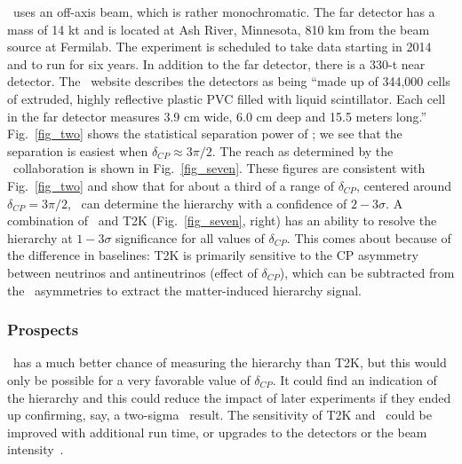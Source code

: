 \NOvA\ uses an off-axis beam, which is rather monochromatic.  The far detector has a mass of 14 kt and is located at Ash River, Minnesota, 810 km from the beam source at Fermilab.  The experiment is scheduled to take data starting in 2014 and to run for six years.  In addition to the far detector, there is a 330-t near detector.   The \NOvA\ website describes the detectors as being ``made up of 344,000 cells of extruded, highly reflective plastic PVC filled with liquid scintillator. Each cell in the far detector measures 3.9 cm wide, 6.0 cm deep and 15.5 meters long.'' 
 Fig.~\ref{fig_two} shows the statistical separation power of \NOvA; we see that the separation is easiest when $\delta_{CP}\approx 3\pi/2.$   
The reach as determined by the \NOvA\ collaboration is shown in Fig.~\ref{fig_seven}.
These figures are consistent with Fig.~\ref{fig_two} and show that 
for about a third of a range of $\delta_{CP}$, centered around
 $\delta_{CP}=3\pi/2$, \NOvA\ can determine the hierarchy with a
 confidence of $2-3\sigma$. A combination of \NOvA\ and T2K
 (Fig.~\ref{fig_seven}, right) has an ability to resolve the hierarchy at
 $1-3\sigma$ significance for all values of $\delta_{CP}$. This comes
 about because of the difference in baselines: T2K is primarily
 sensitive to the CP asymmetry between neutrinos and antineutrinos
 (effect of $\delta_{CP}$), which can be subtracted from the \NOvA\
 asymmetries to extract the matter-induced hierarchy signal. 

\subsubsection{Prospects}

\NOvA\ has a much better chance of measuring the hierarchy than T2K, but this
would only be possible for a very favorable value of $\delta_{CP}$.
It could find an indication of the hierarchy and this could reduce the
impact of later experiments if they ended up confirming, say, a
two-sigma \NOvA\ result.   
The sensitivity of T2K and \NOvA\ could be improved with additional run
time, or upgrades to the detectors or the beam
intensity~\cite{atm:Winter}. 



